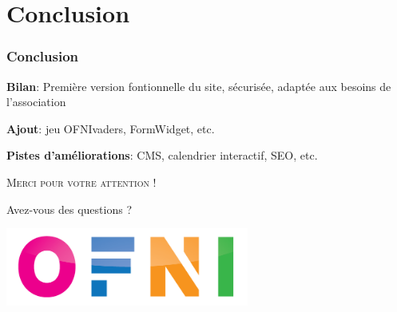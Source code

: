 \section{Conclusion}

\begin{frame}
    \frametitle{Conclusion}
    \centering
    \textbf{Bilan}: Première version fontionnelle du site, sécurisée, adaptée aux besoins de l’association
    \vspace{1cm}

    \textbf{Ajout}: jeu OFNIvaders, FormWidget, etc.
    \vspace{1cm}

    \textbf{Pistes d'améliorations}: CMS, calendrier interactif, SEO, etc.
\end{frame}

\begin{frame}
    \scshape\huge\centering
    \vspace{2cm}
    Merci pour votre attention !\par
    \vspace{1cm}
    Avez-vous des questions ?\par
    \vspace{1cm}

    \includegraphics[width=8cm]{pictures/logo_OFNI.png}
\end{frame}

